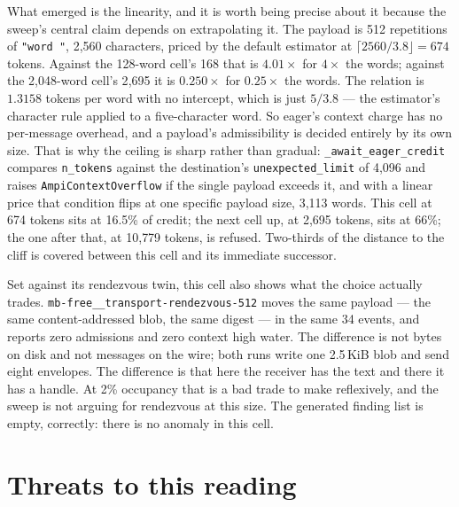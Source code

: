 \documentclass[11pt]{article}
\begin{document}
What emerged is the linearity, and it is worth being precise about it because the
sweep's central claim depends on extrapolating it. The payload is 512 repetitions of
\texttt{"word "}, 2{,}560 characters, priced by the default estimator at
$\lceil 2560/3.8 \rfloor = 674$ tokens. Against the 128-word cell's 168 that is
$4.01\times$ for $4\times$ the words; against the 2{,}048-word cell's 2{,}695 it is
$0.250\times$ for $0.25\times$ the words. The relation is $1.3158$ tokens per word
with no intercept, which is just $5/3.8$ --- the estimator's character rule applied
to a five-character word. So eager's context charge has no per-message overhead, and
a payload's admissibility is decided entirely by its own size. That is why the
ceiling is sharp rather than gradual: \texttt{\_await\_eager\_credit} compares
\texttt{n\_tokens} against the destination's \texttt{unexpected\_limit} of 4{,}096
and raises \texttt{AmpiContextOverflow} if the single payload exceeds it, and with a
linear price that condition flips at one specific payload size, 3{,}113 words. This
cell at 674 tokens sits at 16.5\% of credit; the next cell up, at 2{,}695 tokens,
sits at 66\%; the one after that, at 10{,}779 tokens, is refused. Two-thirds of the
distance to the cliff is covered between this cell and its immediate successor.

Set against its rendezvous twin, this cell also shows what the choice actually
trades. \texttt{mb-free\_\_transport-rendezvous-512} moves the same payload --- the
same content-addressed blob, the same digest --- in the same 34 events, and reports
zero admissions and zero context high water. The difference is not bytes on disk and
not messages on the wire; both runs write one 2.5\,KiB blob and send eight envelopes.
The difference is that here the receiver has the text and there it has a handle. At
2\% occupancy that is a bad trade to make reflexively, and the sweep is not arguing
for rendezvous at this size. The generated finding list is empty, correctly: there is
no anomaly in this cell.

\section{Threats to this reading}
\end{document}
